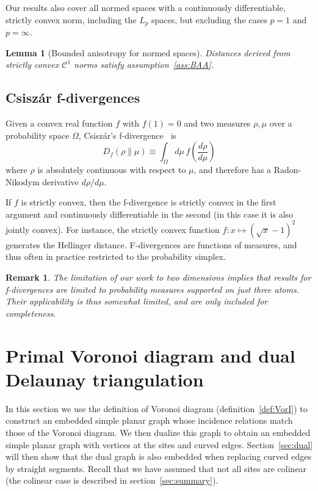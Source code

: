 \documentclass[11pt]{article}
\newtheorem{lemma}{Lemma}
\newtheorem{remark}{Remark}
\begin{document}
Our results also cover all normed spaces with a continuously differentiable, strictly convex norm, 
	including the $L_p$ spaces, 
	but excluding the cases $p=1$ and $p=\infty$. 
\begin{lemma}[Bounded anisotropy for normed spaces]\label{lem:Lpgamma}
	Distances derived from strictly convex $\mathcal{C}^1$ norms satisfy assumption~\ref{ass:BAA}.
\end{lemma}


\subsection{Csisz\'ar f-divergences}\label{sec:Df}

Given a convex real function $f$ with $f(1)=0$ and two measures $\rho,\mu$ over a probability space $\Omega$, 
	Csisz\'ar's f-divergence~\cite{CsiszarTutorial} is
\begin{equation}\label{eq:defDf}
	D_f(\rho\parallel \mu) \equiv \int_{\Omega}d\mu\, f\left(\frac{d\rho}{d\mu}\right) 
\end{equation}
where $\rho$ is absolutely continuous with respect to $\mu$, 
	and therefore has a Radon-Nikodym derivative $d\rho/d\mu$. 

If $f$ is strictly convex, then the f-divergence is strictly convex in the first argument and continuously differentiable in the second 
(in this case it is also jointly convex). 
For instance, the strictly convex function $f:x\mapsto \left(\sqrt x - 1\right)^2$ generates the Hellinger distance. 
F-divergences are functions of measures, and thus often in practice restricted to the probability simplex. 

\begin{remark}The limitation of our work to two dimensions implies that results for f-divergences 
	are limited to probability measures supported on just three atoms. 
Their applicability is thus somewhat limited, and  are only included for completeness. 
\end{remark}







\section{Primal Voronoi diagram and dual Delaunay triangulation}\label{sec:planar}




In this section we use the definition of Voronoi diagram (definition~\ref{def:VorI})
	to construct an embedded simple planar graph whose incidence relations match 
	those of the Voronoi diagram. 
We then dualize this graph to obtain an embedded simple planar graph 
	with vertices at the sites and curved edges. 
Section~\ref{sec:dual} will then show that the dual graph is also embedded when replacing curved edges by straight segments. 
Recall that we have assumed that not all sites are colinear (the colinear case is described in section~\ref{sec:summary}). 
\end{document}
